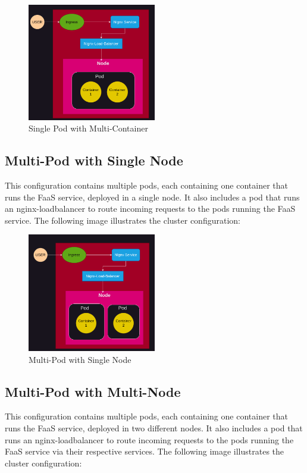 \documentclass{article}
\begin{document}
\begin{figure}[H]
   \centering
   \includegraphics[width=0.5\textwidth]{../images/one_pod_two_container.png}
   \caption{Single Pod with Multi-Container}
\end{figure}

\subsection{Multi-Pod with Single Node}
This configuration contains multiple pods, each containing one container that runs the FaaS service, deployed in a single node. It also includes a pod that runs an nginx-loadbalancer to route incoming requests to the pods running the FaaS service. The following image illustrates the cluster configuration:

\begin{figure}[H]
   \centering
   \includegraphics[width=0.5\textwidth]{../images/one_node_two_pod.png}
   \caption{Multi-Pod with Single Node}
\end{figure}

\subsection{Multi-Pod with Multi-Node}
This configuration contains multiple pods, each containing one container that runs the FaaS service, deployed in two different nodes. It also includes a pod that runs an nginx-loadbalancer to route incoming requests to the pods running the FaaS service via their respective services. The following image illustrates the cluster configuration:
\end{document}
